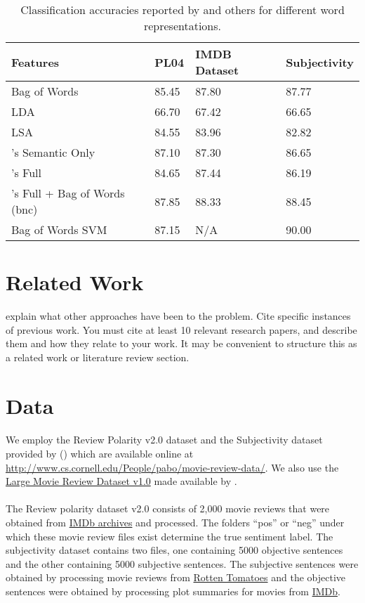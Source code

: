 \documentclass[11pt, oneside]{article}
\begin{document}
\begin{table}[H]
\begin{tabular}{ | l | p{1.5cm} | p{2.5cm} | p{2.5cm} |  }
 \hline
 \textbf{Features} & \textbf{PL04} & \textbf{IMDB Dataset} & \textbf{Subjectivity} \\
 \hline
 Bag of Words   & 85.45 & 87.80 & 87.77 \\
 LDA & 66.70 & 67.42 & 66.65 \\
 LSA & 84.55 & 83.96 & 82.82 \\
 \cite{maas2011learning}'s Semantic Only & 87.10 & 87.30 & 86.65 \\
 \cite{maas2011learning}'s Full & 84.65 & 87.44 & 86.19 \\
 \cite{maas2011learning}'s Full + Bag of Words (bnc) & 87.85 & 88.33 & 88.45 \\
 Bag of Words SVM \cite{pang2004sentimental} & 87.15 & N/A & 90.00 \\
 \hline
\end{tabular}
\caption{Classification accuracies reported by \cite{maas2011learning} and others for different word representations.}
\label{table:1}
\end{table}
\section{Related Work}
explain what other approaches have been to the problem. Cite specific instances of previous work. You must cite at least 10 relevant research papers, and describe them and how they relate to your work. It may be convenient to structure this as a related work or literature review section.
\section{Data}
\paragraph{}
We employ the Review Polarity v2.0 dataset and the Subjectivity dataset provided by (\cite{pang2004sentimental}) which are available online at \url{http://www.cs.cornell.edu/People/pabo/movie-review-data/}. We also use the \href{http://ai.stanford.edu/~amaas/data/sentiment/}{Large Movie Review Dataset v1.0} made available by \cite{maas2011learning}. 
\paragraph{}
The Review polarity dataset v2.0 consists of 2,000 movie reviews that were obtained from \href{http://reviews.imdb.com/Reviews}{IMDb archives} and processed. The folders ``pos'' or ``neg'' under which these movie review files exist determine the true sentiment label. The subjectivity dataset contains two files, one containing 5000 objective sentences and the other containing 5000 subjective sentences. The subjective sentences were obtained by processing movie reviews from \href{http://www.rottentomatoes.com/}{Rotten Tomatoes} and the objective sentences were obtained by processing plot summaries for movies from \href{http://www.imdb.com}{IMDb}.
\end{document}
